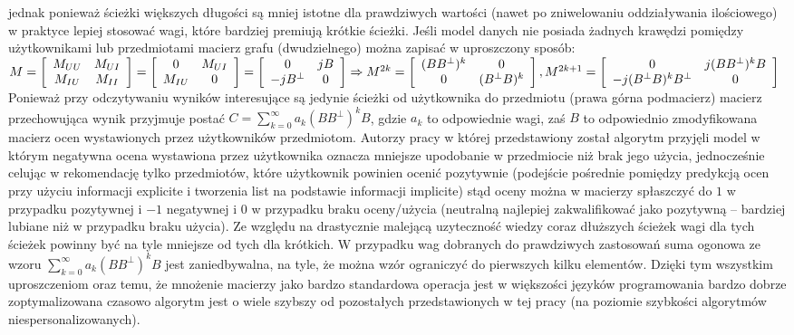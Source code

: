 \documentclass{pracamgr}
\begin{document}
    jednak ponieważ ścieżki większych długości są mniej istotne dla prawdziwych wartości (nawet po zniwelowaniu oddziaływania ilościowego)
    w praktyce lepiej stosować wagi, które bardziej premiują krótkie ścieżki.
    Jeśli model danych nie posiada żadnych krawędzi pomiędzy użytkownikami lub przedmiotami macierz grafu (dwudzielnego)
    można zapisać w uproszczony sposób:\newline
    $M=
     \left[\begin{array}{cc}
     M_{UU}&M_{UI}\\
     M_{IU}&M_{II}
     \end{array}\right]
     =
     \left[\begin{array}{cc}
     0&M_{UI}\\
     M_{IU}&0
     \end{array}\right]
     =
     \left[\begin{array}{cc}
     0&jB\\
     -jB^\bot&0
     \end{array}\right]
     \Rightarrow\newline
     M^{2k}=
     \left[\begin{array}{cc}
     (BB^\bot)^k&0\\
     0&(B^\bot B)^k
     \end{array}\right],
     M^{2k+1}=
     \left[\begin{array}{cc}
     0&j(BB^\bot)^kB\\
     -j(B^\bot B)^kB^\bot&0
     \end{array}\right]
    $\newline
    Ponieważ przy odczytywaniu wyników interesujące są jedynie ścieżki od użytkownika do przedmiotu (prawa górna podmacierz)
    macierz przechowująca wynik przyjmuje postać $C=\sum\limits_{k=0}^{\infty}a_k(BB^\bot)^kB$, gdzie $a_k$ to odpowiednie wagi,
    zaś $B$ to odpowiednio zmodyfikowana macierz ocen wystawionych przez użytkowników przedmiotom.
    Autorzy pracy w której przedstawiony został algorytm przyjęli model w którym negatywna ocena wystawiona przez użytkownika
    oznacza mniejsze upodobanie w przedmiocie niż brak jego użycia, jednocześnie celując w rekomendację tylko przedmiotów,
    które użytkownik powinien ocenić pozytywnie (podejście pośrednie pomiędzy predykcją ocen przy użyciu informacji explicite
    i tworzenia list na podstawie informacji implicite) stąd oceny można w macierzy spłaszczyć do $1$ w przypadku pozytywnej i $-1$ negatywnej
    i $0$ w przypadku braku oceny/użycia (neutralną najlepiej zakwalifikować jako pozytywną -- bardziej lubiane niż w przypadku braku użycia).
    Ze względu na drastycznie malejącą uzyteczność wiedzy coraz dłuższych ścieżek wagi dla tych ścieżek powinny być na tyle mniejsze od tych dla krótkich.
    W przypadku wag dobranych do prawdziwych zastosowań suma ogonowa ze wzoru $\sum\limits_{k=0}^{\infty}a_k(BB^\bot)^kB$ jest zaniedbywalna, na tyle,
    że można wzór ograniczyć do pierwszych kilku elementów.\newline
    Dzięki tym wszystkim uproszczeniom oraz temu,
    że mnożenie macierzy jako bardzo standardowa operacja jest w większości języków programowania bardzo dobrze zoptymalizowana czasowo algorytm
    jest o wiele szybszy od pozostałych przedstawionych w tej pracy (na poziomie szybkości algorytmów niespersonalizowanych).
\end{document}

